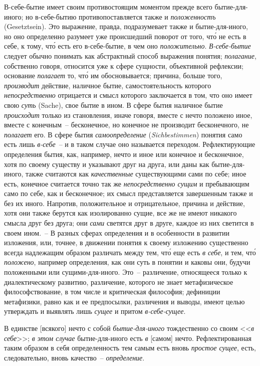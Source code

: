 В-себе-бытие имеет своим противостоящим моментом
прежде всего бытие-для-иного; но в-себе-бытию противопоставляется
также и \emph{положенностъ} (Gesetztsein). Это
выражение, правда, подразумевает также и бытие-для-иного,
но оно определенно разумеет уже происшедший
поворот\endnotemark{} от того, чт\'о не есть в себе, к тому, чт\'о есть
его в-себе-бытие, в чем оно \emph{положительно}. \emph{В-себе-бытие}
следует обычно понимать как абстрактный способ выражения
понятия; \emph{полагание}, собственно говоря, относится
уже к сфере сущности, объективной рефлексии; основание
\emph{полагает} то, чт\'о им обосновывается; причина, больше того,
\emph{производит} действие, наличное бытие, самостоятельность
которого \emph{непосредственно} отрицается и смысл которого
заключается в том, что оно имеет свою \emph{суть} (Sache),
свое бытие в ином. В сфере бытия наличное бытие \emph{происходит}
только из становления, иначе говоря, вместе с
нечто положено иное, вместе с конечным~-- бесконечное,
но конечное не производит бесконечного, не \emph{полагает} его.
В сфере бытия \emph{самоопределение} (\emph{Sichbestimmen}) понятия
само есть лишь \emph{в-себе}~-- и в таком случае оно называется
переходом. Рефлектирующие определения бытия,
как, например, нечто и иное или конечное и бесконечное,
хотя по своему существу и указывают друг на друга,
или даны как бытие-для-иного, также считаются как
\emph{качественные} существующими сами по себе; иное есть,
конечное считается точно так же \emph{непосредственно сущим}
и пребывающим само по себе, как и бесконечное; их
смысл представляется завершенным также и без их иного.
Напротив, положительное и отрицательное, причина
и действие, хотя они также берутся как изолированно
сущие, все же не имеют никакого смысла друг без друга;
они \emph{сами} светятся друг в друге, каждое из них светится
в своем ином.~-- В разных сферах определения и
в особенности в развитии изложения, или, точнее, в движении
понятия к своему изложению существенно всегда
надлежащим образом различать между тем, чт\'о еще есть
\emph{в себе}, и тем, чт\'о \emph{положено}, например определения, как
они суть в понятии и каковы они, будучи положенными
или сущими-для-иного. Это~-- различение, относящееся
только к диалектическому развитию, различение, которого
не знает метафизическое философствование, в том
числе и критическая философия; дефиниции метафизики,
равно как и ее предпосылки, различения и выводы, имеют
целью утверждать и выявлять лишь \emph{сущее} и притом
\emph{в-себе-сущее}.


В единстве [всякого] нечто с собой \emph{бытие-для-иного}
тождественно со своим <<\emph{в себе}>>; \emph{в этом случае} бытие-для-иного
есть \emph{в} [самом] нечто. Рефлектированная таким
образом в себя определенность тем самым есть вновь
\emph{простое сущее}, есть, следовательно, вновь качество~--
\emph{определение}.


